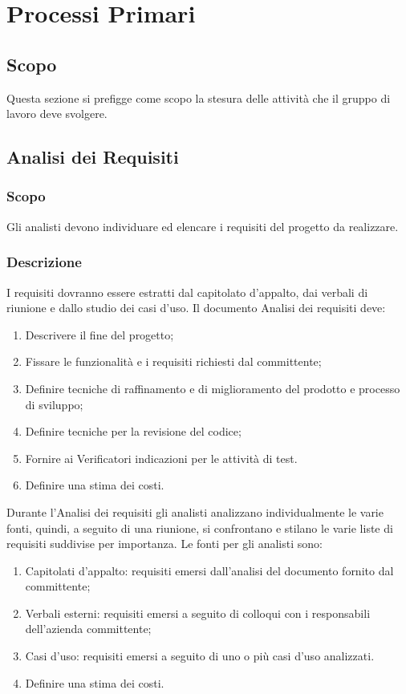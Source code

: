 \documentclass[./../NomeDocumento.tex]{subfiles}
\begin{document}
	
\chapter{Processi Primari}
\section{Scopo}
Questa sezione si prefigge come scopo la stesura delle attività che il gruppo di lavoro deve svolgere.
\section{Analisi dei Requisiti}

	\subsection{Scopo} Gli analisti devono individuare ed elencare i requisiti del progetto da realizzare.
	\subsection{Descrizione}
	I requisiti dovranno essere estratti dal capitolato d’appalto, dai verbali di riunione e dallo studio dei casi d’uso. 
	Il documento Analisi dei requisiti deve:
	\begin{enumerate}
		\item Descrivere il fine del progetto;
		\item Fissare le funzionalità e i requisiti richiesti dal committente;
		\item Definire tecniche di raffinamento e di miglioramento del prodotto e processo di sviluppo;
		\item Definire tecniche per la revisione del codice;
		\item Fornire ai Verificatori indicazioni per le attività di test.
		\item Definire una stima dei costi.
	\end{enumerate}
	 Durante l’Analisi dei requisiti gli analisti analizzano individualmente le varie fonti, quindi, a seguito di una riunione, si confrontano e stilano le varie liste di requisiti suddivise per importanza. Le fonti per gli analisti sono:
	\begin{enumerate}
		\item Capitolati d’appalto: requisiti emersi dall’analisi del documento fornito dal committente;
		\item Verbali esterni: requisiti emersi a seguito di colloqui con i responsabili dell’azienda committente;
		\item Casi d'uso: requisiti emersi a seguito di uno o più casi d’uso analizzati.
		\item Definire una stima dei costi.
	\end{enumerate}
\end{document}

